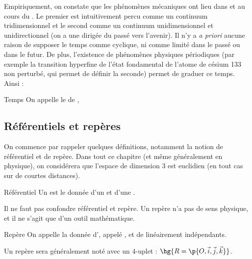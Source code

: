     Empiriquement, on constate que les phénomènes mécaniques ont lieu dans  et au cours du . Le premier est intuitivement percu comme un continuum tridimensionnel et le second comme un continuum unidimensionnel et unidirectionnel (on a une  dirigée du passé vers l'avenir). Il n'y a \textit{a priori} aucune raison de supposer le temps comme cyclique, ni comme limité dans le passé ou dans le futur. De plus, l'existence de phénomènes physiques périodiques (par exemple la transition hyperfine de l'état fondamental de l'atome de césium 133 non perturbé, qui permet de définir la seconde) permet de graduer ce temps. Ainsi :
    \begin{definition}{Temps}{}
        On appelle  le  de , 
    \end{definition}
    
    \subsection{Référentiels et repères}
    
    On commence par rappeler quelques définitions, notamment la notion de référentiel et de repère. Dans tout ce chapitre (et même généralement en physique), on considérera que l'espace de dimension $3$ est euclidien (en tout cas sur de courtes distances).
    
    \begin{definition}{Référentiel}{}
        Un  est le donnée d'un  et d'une .
    \end{definition}
    
    Il ne faut pas confondre référentiel et repère. Un repère n'a pas de sens physique, et il ne s'agit que d'un outil mathématique.
    
    \begin{definition}{Repère}{}
        On appelle  la donnée d', appelé , et de  linéairement indépendants.
    \end{definition}
    
    \begin{notation}
        Un repère  sera généralement noté avec un $4$-uplet : $\hg{R = \p{O, \vec i, \vec j, \vec k}}$.
    \end{notation}
    
